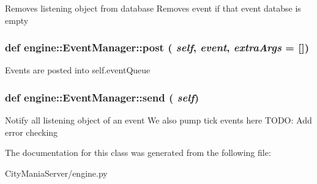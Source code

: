 \begin{DoxyVerb}
Removes listening object from database
Removes event if that event databse is empty
\end{DoxyVerb}
 \hypertarget{classengine_1_1EventManager_a80462c68550513026b2ffe34ede4fca6}{
\subsubsection[{post}]{\setlength{\rightskip}{0pt plus 5cm}def engine::EventManager::post ( {\em self}, \/   {\em event}, \/   {\em extraArgs} = {\ttfamily \mbox{[}\mbox{]}})}}
\label{classengine_1_1EventManager_a80462c68550513026b2ffe34ede4fca6}
\begin{DoxyVerb}
Events are posted into self.eventQueue
\end{DoxyVerb}
 \hypertarget{classengine_1_1EventManager_a20ef19419adf221c5632d4258f1def37}{
\subsubsection[{send}]{\setlength{\rightskip}{0pt plus 5cm}def engine::EventManager::send ( {\em self})}}
\label{classengine_1_1EventManager_a20ef19419adf221c5632d4258f1def37}
\begin{DoxyVerb}
Notify all listening object of an event
We also pump tick events here
TODO: Add error checking
\end{DoxyVerb}
 

The documentation for this class was generated from the following file:\begin{DoxyCompactItemize}
\item 
CityManiaServer/engine.py\end{DoxyCompactItemize}
